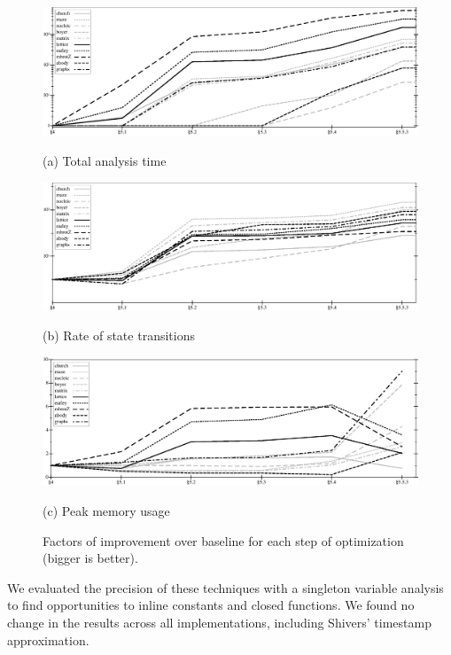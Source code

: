 \documentclass[preprint,onecolumn,9pt]{sigplanconf} %
\begin{document}
\begin{figure}
\begin{center}
  \includegraphics[width=6.5in]{all-relative-time}

  (a) Total analysis time

  \vspace{1em}
  \includegraphics[width=6.5in]{all-relative-speed}

  (b) Rate of state transitions

  \vspace{1em}
  \includegraphics[width=6.5in]{all-relative-space}

  (c) Peak memory usage
\end{center}
\caption{Factors of improvement over baseline for each step of
  optimization (bigger is better).}
\label{fig:bench-all}
\end{figure}

We evaluated the precision of these techniques with a singleton
variable analysis to find opportunities to inline constants and closed
functions. We found no change in the results across all
implementations, including Shivers' timestamp approximation.
\end{document}
